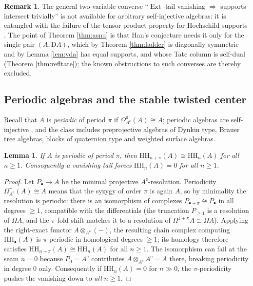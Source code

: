 \documentclass[11pt]{amsart}
\newtheorem{lemma}[theorem]{Lemma}
\theoremstyle{definition}
\newtheorem{remark}[theorem]{Remark}
\newcommand{\HH}{\mathrm{HH}}
\newcommand{\D}{\mathrm{D}}
\newcommand{\Ext}{\operatorname{Ext}}
\newcommand{\Ae}{A^{\mathrm{e}}}
\begin{document}
\begin{remark}
The general two-variable converse ``$\Ext$-tail vanishing $\Rightarrow$
supports intersect trivially'' is not available for arbitrary self-injective
algebras: it is entangled with the failure of the tensor product property
for Hochschild supports \cite{BSS}. The point of Theorem \ref{thm:asnu} is
that Han's conjecture needs it only for the single pair $(A,\D A)$, which by
Theorem \ref{thm:ladder} is diagonally symmetric and by Lemma \ref{lem:vda}
has equal supports, and whose Tate column is self-dual (Theorem
\ref{thm:refltate}); the known obstructions to such converses are thereby
excluded.
\end{remark}

\subsection{Periodic algebras and the stable twisted center}

Recall that $A$ is \emph{periodic} of period $\pi$ if
$\Omega^\pi_{\Ae}(A)\cong A$; periodic algebras are self-injective
\cite{ErdmannSkowronski}, and the class includes preprojective algebras of
Dynkin type, Brauer tree algebras, blocks of quaternion type and weighted
surface algebras.

\begin{lemma}\label{lem:seam}
If $A$ is periodic of period $\pi$, then $\HH_{n+\pi}(A)\cong\HH_n(A)$ for
all $n\ge1$. Consequently a vanishing tail forces $\HH_n(A)=0$ for all
$n\ge1$.
\end{lemma}

\begin{proof}
Let $P_\bullet\to A$ be the minimal projective $\Ae$-resolution. Periodicity
$\Omega^\pi_{\Ae}(A)\cong A$ means that the syzygy of order $\pi$ is again $A$,
so by minimality the resolution is periodic: there is an isomorphism of
complexes $P_{\bullet+\pi}\cong P_\bullet$ in all degrees $\ge1$, compatible
with the differentials (the truncation $P_{\ge1}$ is a resolution of
$\Omega A$, and the $\pi$-fold shift matches it to a resolution of
$\Omega^{1+\pi}A\cong\Omega A$). Applying the right-exact functor
$A\otimes_{\Ae}(-)$, the resulting chain complex computing $\HH_\bullet(A)$ is
$\pi$-periodic in homological degrees $\ge1$; its homology therefore satisfies
$\HH_{n+\pi}(A)\cong\HH_n(A)$ for all $n\ge1$. The isomorphism can fail at the
seam $n=0$ because $P_0=\Ae$ contributes $A\otimes_{\Ae}\Ae=A$ there, breaking
periodicity in degree $0$ only. Consequently if $\HH_n(A)=0$ for $n\gg0$, the
$\pi$-periodicity pushes the vanishing down to \emph{all} $n\ge1$.
\end{proof}
\end{document}
